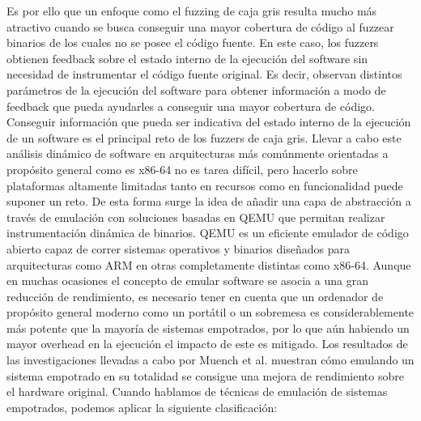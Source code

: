 Es por ello que un enfoque como el fuzzing de caja gris resulta mucho más atractivo cuando se busca conseguir una mayor cobertura de código
al fuzzear binarios de los cuales no se posee el código fuente. En este caso, los fuzzers obtienen feedback sobre el estado interno de la ejecución
del software sin necesidad de instrumentar el código fuente original.
Es decir, observan distintos parámetros de la ejecución del software para obtener información a modo de feedback que pueda ayudarles 
a conseguir una mayor cobertura de código. Conseguir información que pueda ser indicativa del estado interno de la ejecución de un software es
el principal reto de los fuzzers de caja gris. Llevar a cabo este análisis dinámico de software en arquitecturas más comúnmente orientadas a 
propósito general como es x86-64 no es tarea difícil, pero hacerlo sobre plataformas altamente limitadas tanto en recursos como en funcionalidad
puede suponer un reto. De esta forma surge la idea de añadir una capa de abstracción a través de emulación con soluciones basadas en QEMU\cite{qemu}
que permitan realizar instrumentación dinámica de binarios. QEMU es un eficiente emulador de código abierto capaz de correr sistemas operativos y binarios
diseñados para arquitecturas como ARM en otras completamente distintas como x86-64. Aunque en muchas ocasiones el concepto de emular software se asocia a
una gran reducción de rendimiento, es necesario tener en cuenta que un ordenador de propósito general moderno como un portátil o un sobremesa es 
considerablemente más potente que la mayoría de sistemas empotrados, por lo que aún habiendo un mayor overhead en la ejecución el impacto de este es mitigado.
Los resultados de las investigaciones llevadas a cabo por Muench et al.\cite{Muench2018} muestran cómo emulando un sistema empotrado en su totalidad 
se consigue una mejora de rendimiento sobre el hardware original.
Cuando hablamos de técnicas de emulación de sistemas empotrados, podemos aplicar la siguiente clasificación:

